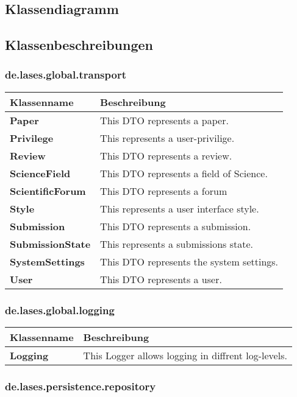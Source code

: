 
\newcommand{\classtable}[1]{\begin{longtable}[H]{m{5cm}m{9cm}}
		\hline
		\textbf{Klassenname} & \textbf{Beschreibung} \\
		\hline
		\hline
		#1
	\end{longtable}
}

\newcommand{\classentry}[2]{\textbf{#1} & #2 \\
	}


\subsection{Klassendiagramm}


\subsection{Klassenbeschreibungen}

\subsubsection{de.lases.global.transport}

\classtable{
    \classentry{Paper}{This DTO represents a paper.}
    \classentry{Privilege}{This represents a user-privilige.}
    \classentry{Review}{This DTO represents a review.}
    \classentry{ScienceField}{This DTO represents a field of Science.}
    \classentry{ScientificForum}{This DTO represents a forum}
    \classentry{Style}{This represents a user interface style.}
    \classentry{Submission}{This DTO represents a submission.}
    \classentry{SubmissionState}{This represents a submissions state.}
    \classentry{SystemSettings}{This DTO represents the system settings.}
    \classentry{User}{This DTO represents a user.}
}

\subsubsection{de.lases.global.logging}

\classtable{
	\classentry{Logging}{This Logger allows logging in diffrent log-levels.}
}

\subsubsection{de.lases.persistence.repository}

